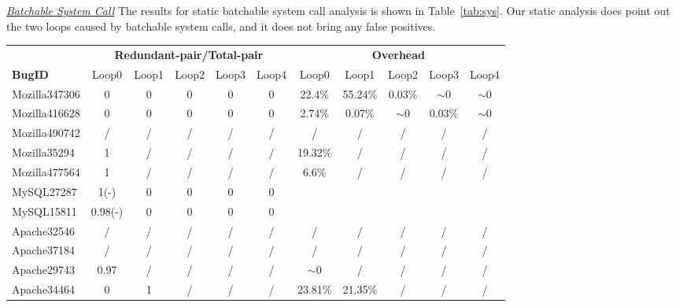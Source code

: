 \underline{\textit{Batchable System Call}}
The results for static batchable system call analysis is shown in Table~\ref{tab:sys}. 
Our static analysis does point out the two loops caused by batchable system calls, and it does not bring any false positives. 

\begin{table*}
  \centering
  \scriptsize
  \newcommand{\Yes}[1]{\checkmark{}$_#1$}
  \newcommand{\No}[0]{-}
  \begin{tabular}{lcccccccccc}
    \toprule
              &  \multicolumn{5}{c}{\bf Redundant-pair/Total-pair} & \multicolumn{5}{c}{\bf Overhead} \\
\cmidrule(lr){2-6} \cmidrule(lr){7-11} 
   {\bf BugID}      & Loop0 & Loop1 &  Loop2 &   Loop3 &   Loop4 & Loop0     &   Loop1   &   Loop2 &  Loop3 &   Loop4   \\
    \midrule
    Mozilla347306   & 0     & 0     &  0     &   0     &   0     &  22.4\%   &   55.24\% & 0.03\%  &$\sim$0 &  $\sim$0   \\
    Mozilla416628   & 0     & 0     &  0     &   0     &   0     &  2.74\%   &   0.07\%  & $\sim$0 &  0.03\%&  $\sim$0    \\
    Mozilla490742   & /     & /     & /      & /       &   /     & /         & /         & /       &  /     &  /      \\
    Mozilla35294    & 1     & /     & /      & /       &   /     & 19.32\%   & /   & /       &  /     &  /      \\
    Mozilla477564   & 1     & /     & /      & /       &   /     & 6.6\%     & /         & /       &  /     &  /    \\
    \midrule
    MySQL27287      & 1(\No) & 0     & 0      & 0      &   0     &           &     &        &   &        \\
    MySQL15811      & 0.98(\No) & 0  & 0      & 0      & 0       &           &         &           &       &         \\
    \midrule
    Apache32546     & /     & /     & /      & /       &   /     & /        & /        & /           &  /       &  /       \\
    Apache37184     & /     & /     & /      & /       &   /     & /        & /        & /           &  /       &  /       \\
    Apache29743     & 0.97  & /     & /      & /       &   /     & $\sim$0  & /        & /           &  /       &  /       \\
    Apache34464     & 0     & 1     & /      & /       &   /     & 23.81\%  & 21.35\%  & /           &  /       &  /      \\

\end{tabular}
\end{table*}
